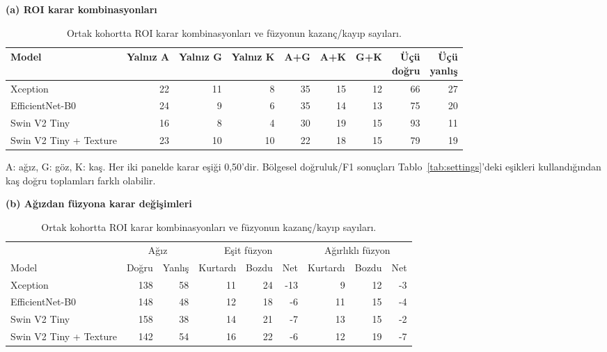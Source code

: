 \documentclass[a4paper]{elektr}
\begin{document}
\begin{table}[!htbp]\centering\begin{minipage}{15.8cm}
\caption{Ortak kohortta ROI karar kombinasyonları ve füzyonun kazanç/kayıp sayıları.}\label{tab:errors}
\centering \small
\textbf{(a) ROI karar kombinasyonları}\par\smallskip
\begin{tabular*}{\linewidth}{@{\extracolsep{\fill}}lrrrrrrrr@{}}\toprule
Model & Yalnız A & Yalnız G & Yalnız K & A+G & A+K & G+K & \shortstack{Üçü\\doğru} & \shortstack{Üçü\\yanlış} \\\midrule
Xception & 22 & 11 & 8 & 35 & 15 & 12 & 66 & 27 \\
EfficientNet-B0 & 24 & 9 & 6 & 35 & 14 & 13 & 75 & 20 \\
Swin V2 Tiny & 16 & 8 & 4 & 30 & 19 & 15 & 93 & 11 \\
Swin V2 Tiny + Texture & 23 & 10 & 10 & 22 & 18 & 15 & 79 & 19 \\
\bottomrule\end{tabular*}
\par\smallskip\begin{minipage}{\linewidth}\small A: ağız, G: göz, K: kaş. Her iki panelde karar eşiği 0,50’dir. Bölgesel doğruluk/F1 sonuçları Tablo~\ref{tab:settings}’deki eşikleri kullandığından kaş doğru toplamları farklı olabilir.\end{minipage}
\par\medskip\small\textbf{(b) Ağızdan füzyona karar değişimleri}\par\smallskip
\begin{tabular*}{\linewidth}{@{\extracolsep{\fill}}lrrrrrrrr@{}}\toprule
 & \multicolumn{2}{c}{Ağız} & \multicolumn{3}{c}{Eşit füzyon} & \multicolumn{3}{c}{Ağırlıklı füzyon}\\
Model & Doğru & Yanlış & Kurtardı & Bozdu & Net & Kurtardı & Bozdu & Net\\\midrule
Xception & 138 & 58 & 11 & 24 & -13 & 9 & 12 & -3 \\
EfficientNet-B0 & 148 & 48 & 12 & 18 & -6 & 11 & 15 & -4 \\
Swin V2 Tiny & 158 & 38 & 14 & 21 & -7 & 13 & 15 & -2 \\
Swin V2 Tiny + Texture & 142 & 54 & 16 & 22 & -6 & 12 & 19 & -7 \\\bottomrule\end{tabular*}\end{minipage}\end{table}
\end{document}
